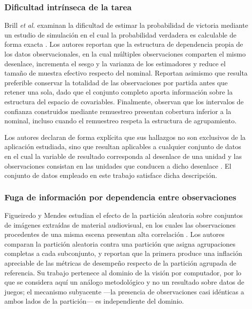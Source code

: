 
\subsubsection{Dificultad intrínseca de la tarea}

Brill \textit{et al.} examinan la dificultad de estimar la probabilidad de
victoria mediante un estudio de simulación en el cual la probabilidad
verdadera es calculable de forma exacta \cite{brill_winprob_2026}. Los
autores reportan que la estructura de dependencia propia de los datos
observacionales, en la cual múltiples observaciones comparten el mismo
desenlace, incrementa el sesgo y la varianza de los estimadores y reduce el
tamaño de muestra efectivo respecto del nominal. Reportan asimismo que
resulta preferible conservar la totalidad de las observaciones por partida
antes que retener una sola, dado que el conjunto completo aporta
información sobre la estructura del espacio de covariables. Finalmente,
observan que los intervalos de confianza construidos mediante remuestreo
presentan cobertura inferior a la nominal, incluso cuando el remuestreo
respeta la estructura de agrupamiento.

Los autores declaran de forma explícita que sus hallazgos no son
exclusivos de la aplicación estudiada, sino que resultan aplicables a
cualquier conjunto de datos en el cual la variable de resultado
corresponda al desenlace de una unidad y las observaciones consistan en
las unidades que conducen a dicho desenlace
\cite{brill_winprob_2026}. El conjunto de datos empleado en este trabajo
satisface dicha descripción.

\subsubsection{Fuga de información por dependencia entre observaciones}

Figueiredo y Mendes estudian el efecto de la partición aleatoria sobre
conjuntos de imágenes extraídas de material audiovisual, en los cuales las
observaciones procedentes de una misma escena presentan alta correlación
\cite{figueiredo_leakage_2024}. Los autores comparan la partición
aleatoria contra una partición que asigna agrupaciones completas a cada
subconjunto, y reportan que la primera produce una inflación apreciable de
las métricas de desempeño respecto de la partición agrupada de referencia.
Su trabajo pertenece al dominio de la visión por computador, por lo que se
considera aquí un análogo metodológico y no un resultado sobre datos de
juegos; el mecanismo subyacente ---la presencia de observaciones casi
idénticas a ambos lados de la partición--- es independiente del dominio.

